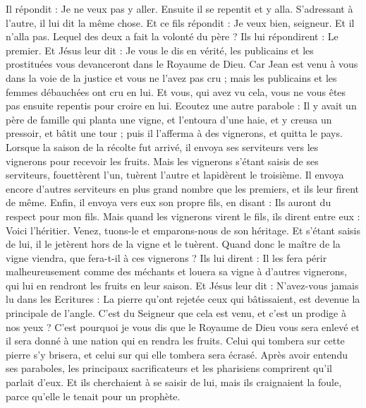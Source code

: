 \begin{multicols}{2}
Il répondit : Je ne veux pas y aller. Ensuite il se repentit et y alla.
S'adressant à l'autre, il lui dit la même chose. Et ce fils répondit : Je veux bien, seigneur. Et il n'alla pas.
Lequel des deux a fait la volonté du père ? Ils lui répondirent : Le premier. Et Jésus leur dit : Je vous le dis en vérité, les publicains et les prostituées vous devanceront dans le Royaume de Dieu.
Car Jean est venu à vous dans la voie de la justice et vous ne l'avez pas cru ; mais les publicains et les femmes débauchées ont cru en lui. Et vous, qui avez vu cela, vous ne vous êtes pas ensuite repentis pour croire en lui.
Ecoutez une autre parabole : Il y avait un père de famille qui planta une vigne, et l'entoura d'une haie, et y creusa un pressoir, et bâtit une tour ; puis il l'afferma à des vignerons, et quitta le pays.
Lorsque la saison de la récolte fut arrivé, il envoya ses serviteurs vers les vignerons pour recevoir les fruits.
Mais les vignerons s'étant saisis de ses serviteurs, fouettèrent l'un, tuèrent l'autre et lapidèrent le troisième.
Il envoya encore d'autres serviteurs en plus grand nombre que les premiers, et ils leur firent de même.
Enfin, il envoya vers eux son propre fils, en disant : Ils auront du respect pour mon fils.
Mais quand les vignerons virent le fils, ils dirent entre eux : Voici l'héritier. Venez, tuons-le et emparons-nous de son héritage.
Et s'étant saisis de lui, il le jetèrent hors de la vigne et le tuèrent.
Quand donc le maître de la vigne viendra, que fera-t-il à ces vignerons ?
Ils lui dirent : Il les fera périr malheureusement comme des méchants et louera sa vigne à d'autres vignerons, qui lui en rendront les fruits en leur saison.
Et Jésus leur dit : N'avez-vous jamais lu dans les Ecritures : La pierre qu'ont rejetée ceux qui bâtissaient, est devenue la principale de l'angle. C'est du Seigneur que cela est venu, et c'est un prodige à nos yeux ?
C'est pourquoi je vous dis que le Royaume de Dieu vous sera enlevé et il sera donné à une nation qui en rendra les fruits.
Celui qui tombera sur cette pierre s'y brisera, et celui sur qui elle tombera sera écrasé.
Après avoir entendu ses paraboles, les principaux sacrificateurs et les pharisiens comprirent qu'il parlait d'eux.
Et ils cherchaient à se saisir de lui, mais ils craignaient la foule, parce qu'elle le tenait pour un prophète.

\end{multicols}
